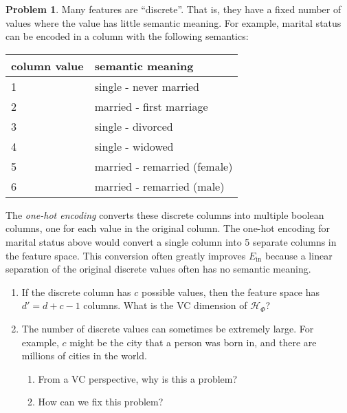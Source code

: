 \documentclass[10pt]{exam}
\theoremstyle{definition}
\newtheorem{problem}{Problem}
\newcommand{\Ein}{E_{\text{in}}}
\newcommand{\HH}[1]{\mathcal H_{\text{#1}}}
\begin{document}
\begin{problem}
    Many features are ``discrete''.
    That is, they have a fixed number of values where the value has little semantic meaning.
    For example, marital status can be encoded in a column with the following semantics:

    \vspace{0.15in}
    \begin{tabular}{ll}
        \toprule
        column value & semantic meaning \\
        \midrule
        1 & single - never married \\
        2 & married - first marriage \\
        3 & single - divorced \\
        4 & single - widowed \\
        5 & married - remarried (female) \\ 
        6 & married - remarried (male) \\ 
        \bottomrule
    \end{tabular}

    \vspace{0.15in}
    \noindent
    The \emph{one-hot encoding} converts these discrete columns into multiple boolean columns, one for each value in the original column.
    The one-hot encoding for marital status above would convert a single column into 5 separate columns in the feature space.
    This conversion often greatly improves $\Ein$ because a linear separation of the original discrete values often has no semantic meaning.
    \begin{enumerate}
        \item 
            If the discrete column has $c$ possible values,
            then the feature space has $d' = d + c - 1$ columns.
            What is the VC dimension of $\HH{$\Phi$}$?
            \vspace{1.5in}

        \item
            The number of discrete values can sometimes be extremely large.
            For example, $c$ might be the city that a person was born in, and there are millions of cities in the world.
            \begin{enumerate}
            \item From a VC perspective, why is this a problem?
                \vspace{2in}
            \item How can we fix this problem?
            \end{enumerate}
    \end{enumerate}
\end{problem}
\end{document}
